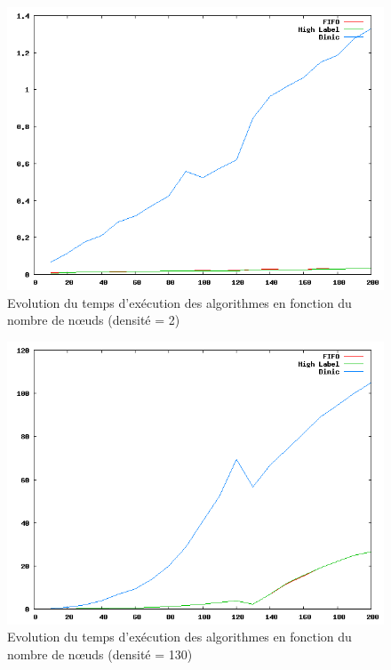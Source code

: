 \begin{figure}
\begin{center}
\includegraphics[scale=0.6]{../data_struct/results/ratio2.png}
\end{center}
\caption{Evolution du temps d'exécution des algorithmes en fonction du nombre de n\oe uds (densité =
2)}
\label{d2}
\end{figure}

\begin{figure}
\begin{center}
\includegraphics[scale=0.6]{../data_struct/results/ratio130.png}
\end{center}
\caption{Evolution du temps d'exécution des algorithmes en fonction du nombre de n\oe uds (densité =
130)}
\label{d130}
\end{figure}

